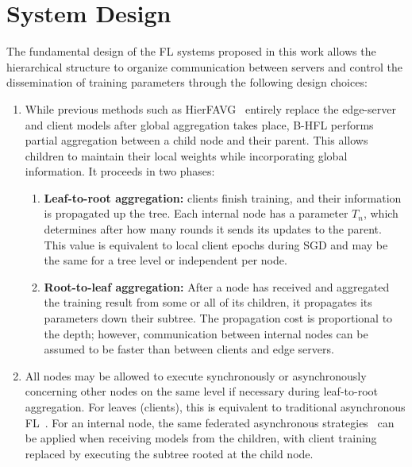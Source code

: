 \section{System Design}\label{sec:proposal:system_design}

The fundamental design of the FL systems proposed in this work allows the hierarchical structure to organize communication between servers and control the dissemination of training parameters through the following design choices:
\begin{singlespace*}
    \begin{enumerate}
        \item While previous methods such as HierFAVG~\citep{Client-Edge-CloudHierFL,Hier_Het_Cellular} entirely replace the edge-server and client models after global aggregation takes place, B-HFL performs partial aggregation between a child node and their parent. This
              allows children to maintain their local weights while incorporating global information. It proceeds in two phases:

              \begin{enumerate}
                  \item \textbf{Leaf-to-root aggregation:} clients finish training, and their information is propagated up the tree. Each internal node has a parameter $T_n$, which determines after how many rounds it sends its updates to the parent. This value is equivalent to local client epochs during SGD and may be the same for a tree level or independent per node.
                  \item \textbf{Root-to-leaf aggregation:} After a node has received and aggregated the training result from some or all of its children, it propagates its parameters down their subtree. The propagation cost is proportional to the depth; however, communication between internal nodes can be assumed to be faster than between clients and edge servers.
              \end{enumerate}

        \item All nodes may be allowed to execute synchronously or asynchronously concerning other nodes on the same level if necessary during leaf-to-root aggregation. For leaves (clients), this is equivalent to traditional asynchronous FL~\citep{AsynchronousFLonHetDevicesSurvey}. For an internal node, the same federated asynchronous strategies~\citep{FedBuff,PAPAYA} can be applied when receiving models from the children, with client training replaced by executing the subtree rooted at the child node.


\end{enumerate}
\end{singlespace*}
